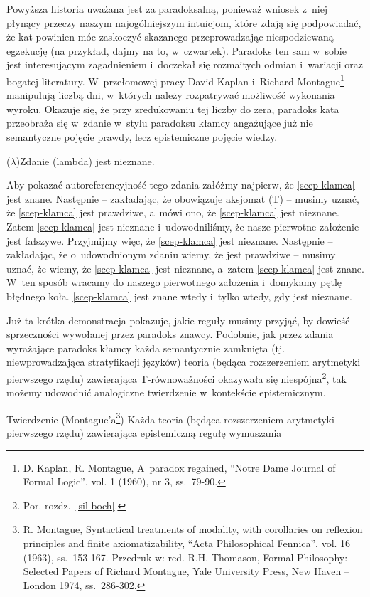{Powyższa historia uważana jest za paradoksalną, ponieważ wniosek z~niej płynący przeczy naszym najogólniejszym intuicjom, które zdają się podpowiadać, że kat powinien móc zaskoczyć skazanego przeprowadzając niespodziewaną egzekucję (na przykład, dajmy na to, w~czwartek). Paradoks ten sam w~sobie jest interesującym zagadnieniem i~doczekał się rozmaitych odmian i~wariacji oraz bogatej literatury. W~przełomowej pracy David Kaplan i~Richard Montague\footnote{D. Kaplan, R. Montague, A~paradox regained, ``Notre Dame Journal of Formal Logic'', vol. 1 (1960), nr 3, ss.~79-90.} manipulują liczbą dni, w~których należy rozpatrywać możliwość wykonania wyroku. Okazuje się, że przy zredukowaniu tej liczby do zera, paradoks kata przeobraża się w~zdanie w~stylu paradoksu kłamcy angażujące już nie semantyczne pojęcie prawdy, lecz epistemiczne pojęcie wiedzy.

($\lambda$)Zdanie (lambda) jest nieznane.\label{scep-klamca}

Aby pokazać autoreferencyjność tego zdania załóżmy najpierw, że \ref{scep-klamca} jest znane. Następnie -- zakładając, że obowiązuje aksjomat (T) -- musimy uznać, że \ref{scep-klamca} jest prawdziwe, a~mówi ono, że \ref{scep-klamca} jest nieznane. Zatem \ref{scep-klamca} jest nieznane i~udowodniliśmy, że nasze pierwotne założenie jest fałszywe. Przyjmijmy więc, że \ref{scep-klamca} jest nieznane. Następnie -- zakładając, że o~udowodnionym zdaniu wiemy, że jest prawdziwe -- musimy uznać, że wiemy, że \ref{scep-klamca} jest nieznane, a~zatem \ref{scep-klamca} jest znane. W~ten sposób wracamy do naszego pierwotnego założenia i~domykamy pętlę błędnego koła. \ref{scep-klamca} jest znane wtedy i~tylko wtedy, gdy jest nieznane.

Już ta krótka demonstracja pokazuje, jakie reguły musimy przyjąć, by dowieść sprzeczności wywołanej przez paradoks znawcy. Podobnie, jak przez zdania wyrażające paradoks kłamcy każda semantycznie zamknięta (tj. niewprowadzająca stratyfikacji języków) teoria (będąca rozszerzeniem arytmetyki pierwszego rzędu) zawierająca T-równoważności okazywała się niespójna\footnote{Por. rozdz.~\ref{sil-boch}.}, tak możemy udowodnić analogiczne twierdzenie w~kontekście epistemicznym.

Twierdzenie (Montague'a\footnote{R. Montague, Syntactical treatments of modality, with corollaries on reflexion principles and finite axiomatizability, ``Acta Philosophical Fennica'', vol. 16 (1963), ss.~153-167. Przedruk w: red. R.H. Thomason, Formal Philosophy: Selected Papers of Richard Montague, Yale University Press, New Haven -- London 1974, ss.~286-302.}) Każda teoria (będąca rozszerzeniem arytmetyki pierwszego rzędu) zawierająca epistemiczną regułę wymuszania

}
